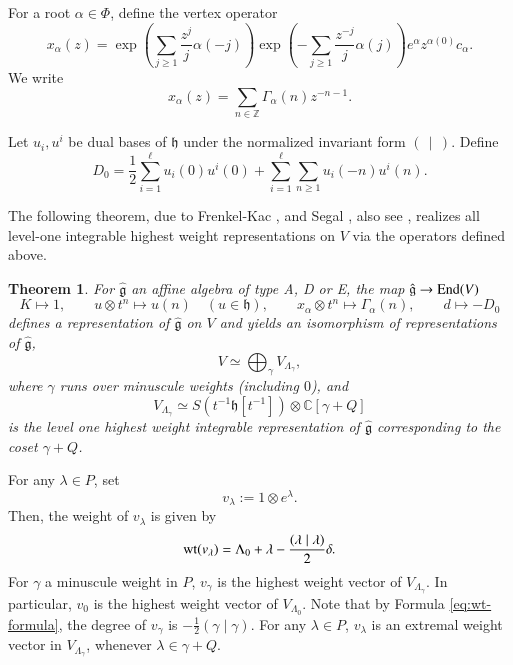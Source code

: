 \documentclass[a4paper, 12pt]{amsart}
\newtheorem{theorem}{Theorem}[section]
\theoremstyle{definition}
\begin{document}
For a root
$\alpha\in\Phi$, define the vertex operator
\begin{equation}
\label{eq:Gamma-alpha}
x_\alpha(z)
=
\exp\!\left(\sum_{j\ge1}\frac{z^j}{j}\alpha(-j)\right)
\exp\!\left(-\sum_{j\ge1}\frac{z^{-j}}{j}\alpha(j)\right)
e^\alpha z^{\alpha(0)}c_\alpha.
\end{equation}
We write
\[
x_\alpha(z)
=
\sum_{n\in\mathbb Z}\Gamma_\alpha(n)z^{-n-1}.
\]


Let $u_i,u^i$ be dual bases of $\mathfrak h$ under the normalized invariant form $(\,\mid\,)$.  Define
\begin{equation}
\label{eq:D0}
D_0
=
\frac12\sum_{i=1}^{\ell}u_i(0)u^i(0)
+
\sum_{i=1}^{\ell}\sum_{n\ge1}u_i(-n)u^i(n).
\end{equation}

The following theorem, due to Frenkel-Kac \cite{FK}, and Segal \cite{Se}, also see \cite{Do}, realizes all level-one integrable highest weight
representations on $V$ via the operators defined above. 
\begin{theorem}\label{thm:FKS}
For $\hat{\mathfrak{g}}$ an affine algebra of type A, D or E, the map $\hat{\mathfrak{g}} \rightarrow {\rm End}(V)$
\[
K\longmapsto 1,
\qquad
u\otimes t^n\longmapsto u(n)
\quad (u\in\mathfrak h),
\qquad
x_\alpha\otimes t^n\longmapsto \Gamma_\alpha(n),
\qquad
d\longmapsto -D_0
\]
defines a representation of $\hat{\mathfrak g}$ on $V$ and yields an
isomorphism of representations of $\hat{\mathfrak{g}}$, 
\[
 V\simeq  \bigoplus_{\gamma } V_{\Lambda_\gamma} ,
\]
where $\gamma$ runs over minuscule weights (including $0$), and  
$$V_{\Lambda_\gamma}\simeq  S(t^{-1}\mathfrak{h}[t^{-1}])\otimes \mathbb{C}[\gamma+Q] $$
 is the level one highest weight integrable representation of $\hat{\mathfrak{g}}$ corresponding to the coset $\gamma+Q$.
\end{theorem}

For any $\lambda\in P$, set 
\begin{equation}\label{eq:deg_form}
 v_{\lambda}:= 1\otimes e^{\lambda} . \end{equation}
Then, the weight of $v_\lambda$ is given by
\begin{equation}\label{eq:wt-formula}
 {\rm wt}(v_\lambda)= \Lambda_0+\lambda- \frac{ (\lambda\mid \lambda)}{2} \delta .  \end{equation}
For $\gamma$ a minuscule weight in $P$, $v_{\gamma}$ is the highest weight vector of $V_{\Lambda_\gamma}$. 
In particular, $v_0$ is the highest weight vector of $V_{\Lambda_0}$. Note that by Formula \eqref{eq:wt-formula},  the degree of $v_{\gamma}$ is $-\frac{1}{2} (\gamma\mid \gamma)$. For any $\lambda\in P$, $v_\lambda$ is an extremal weight vector in $V_{\Lambda_\gamma}$, whenever $\lambda\in \gamma+Q$. 
\end{document}
